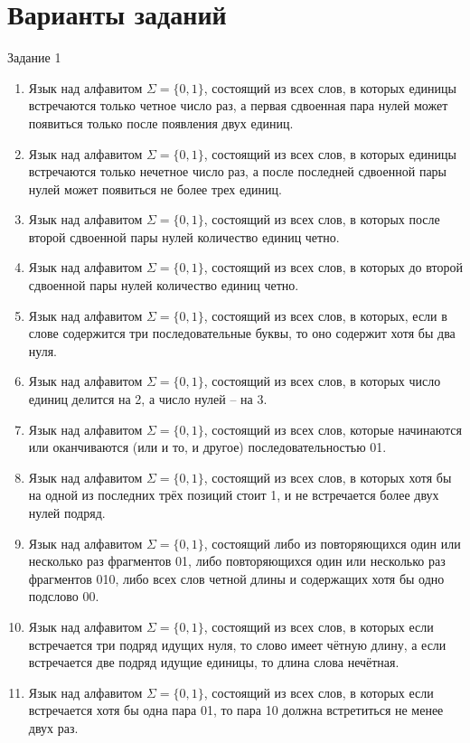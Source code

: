 \renewcommand{\theAlgoEnv}{\Alph{chapter}.\arabic{AlgoEnv}}

\chapter{Варианты заданий}
Задание 1
\begin{enumerate}
\item Язык над алфавитом $\Sigma=\{0,1\}$, состоящий из всех слов, в которых единицы встречаются только четное число раз, а первая сдвоенная пара нулей может появиться только после появления двух единиц.
\item Язык над алфавитом $\Sigma=\{0,1\}$, состоящий из всех слов, в которых единицы встречаются только нечетное число раз, а после последней сдвоенной пары нулей может появиться не более трех единиц.
\item Язык над алфавитом $\Sigma=\{0,1\}$, состоящий из всех слов, в которых после второй сдвоенной пары нулей количество единиц четно.
\item Язык над алфавитом $\Sigma=\{0,1\}$, состоящий из всех слов, в которых до второй сдвоенной пары нулей количество единиц четно.
\item Язык над алфавитом $\Sigma=\{0,1\}$, состоящий из всех слов, в которых, если в слове содержится три последовательные буквы, то оно содержит хотя бы два нуля.
\item Язык над алфавитом $\Sigma=\{0,1\}$, состоящий из всех слов, в которых число единиц делится на 2, а число нулей -- на 3.
\item Язык над алфавитом $\Sigma=\{0,1\}$, состоящий из всех слов, которые начинаются или оканчиваются (или и то, и другое) последовательностью 01.
\item Язык над алфавитом $\Sigma=\{0,1\}$, состоящий из всех слов, в которых хотя бы на одной из последних трёх позиций стоит 1, и не встречается более двух нулей подряд.
\item Язык над алфавитом $\Sigma=\{0,1\}$, состоящий либо из повторяющихся один или несколько раз фрагментов 01, либо повторяющихся один или несколько раз фрагментов 010, либо всех слов четной длины и содержащих хотя бы одно подслово 00.
\item Язык над алфавитом $\Sigma=\{0,1\}$, состоящий из всех слов, в которых если встречается три подряд идущих нуля, то слово имеет чётную длину, а если встречается две подряд идущие единицы, то длина слова нечётная.
\item Язык над алфавитом $\Sigma=\{0,1\}$, состоящий из всех слов, в которых если встречается хотя бы одна пара 01, то пара 10 должна встретиться не менее двух раз.

\end{enumerate}
